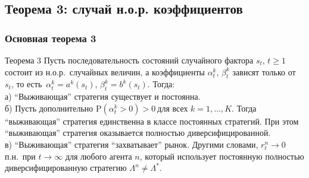 \documentclass[10pt]{beamer}
\theoremstyle{definition}
\theoremstyle{remark}
\renewcommand{\P}{\mathrm{P}}
\begin{document}
\subsection{Теорема 3: случай н.о.р. коэффициентов}
\begin{frame}\frametitle{Основная теорема 3}
	\begin{block}{Теорема 3}
    Пусть последовательность состояний случайного фактора $s_t$, $t\ge1$ состоит из н.о.р.\ случайных величин, а коэффициенты $\alpha_{t}^k$, $\beta_{t}^k$  зависят только от $s_t$, то есть\ $\alpha_{t}^k = a^k(s_t)$, $\beta_{t}^k = b^k(s_t)$.
    Тогда:\\
    а) ``Выживающая'' стратегия существует и постоянна.\\
    б) Пусть дополнительно $\P(\alpha_{t}^k > 0) > 0\ \text{для всех $k=1,\dots,K$}.$ Тогда ``выживающая'' стратегия единственна в классе постоянных стратегий. При этом ``выживающая'' стратегия оказывается полностью диверсифицированной.\\
    в)  ``Выживающая'' стратегия ``захватывает'' рынок. Другими словами, $r_t^n\to0$ п.н.\ при $t\to\infty$ для любого агента $n$, который использует постоянную полностью диверсифицированную стратегию $\Lambda^n \neq\Lambda^*$.
    \end{block}

\end{frame}



\end{document}
